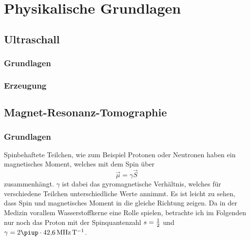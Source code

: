 \documentclass[
    11pt,
    ngerman
]{scrreprt}
\begin{document}
\chapter{Physikalische Grundlagen}

\section{Ultraschall}

\subsection{Grundlagen}

\subsection{Erzeugung}

\section{Magnet-Resonanz-Tomographie}

\subsection{Grundlagen}

Spinbehaftete Teilchen, wie zum Beispiel Protonen oder Neutronen haben ein magnetisches Moment, welches mit dem Spin über
\[
    \vec\mu = \gamma\vec S
\]
zusammenhängt. $\gamma$ ist dabei das gyromagnetische Verhältnis, welches für
verschiedene Teilchen unterschiedliche Werte annimmt. Es ist leicht zu sehen,
dass Spin und magnetisches Moment in die gleiche Richtung zeigen. Da in der
Medizin vorallem Wasserstoffkerne eine Rolle spielen, betrachte ich im
Folgenden nur noch das Proton mit der Spinquantenzahl $s = \frac 12$ und $\gamma =
2\piup\cdot\SI{42.6}{\mega\hertz\per\tesla}$.
\end{document}
